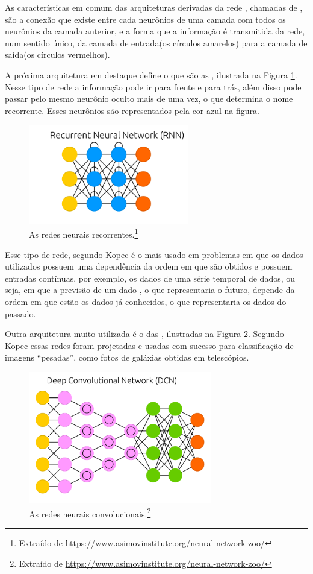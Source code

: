 As características em comum das arquiteturas derivadas da rede , chamadas de , são a conexão que existe entre cada neurônios de uma camada com todos os neurônios da camada anterior, e a forma que a informação é transmitida da rede, num sentido único, da camada de entrada(os círculos amarelos) para a camada de saída(os círculos vermelhos).

A próxima arquitetura em destaque define o que são as , ilustrada na Figura \ref{fig:estrutura_r}. Nesse tipo de rede a informação pode ir para frente e para trás, além disso pode passar pelo mesmo neurônio oculto mais de uma vez, o que determina o nome recorrente. Esses neurônios são representados pela cor azul na figura.

\begin{figure}[htb]
\centering
\includegraphics[width=7cm]{figuras/estrutura_r}
\caption{As redes neurais recorrentes.\footnote{Extraído de \url{https://www.asimovinstitute.org/neural-network-zoo/}}}
\label{fig:estrutura_r}
\end{figure}

Esse tipo de rede, segundo Kopec \citep{classic} é o mais usado em problemas em que os dados utilizados possuem uma dependência da ordem em que são obtidos e possuem entradas contínuas, por exemplo, os dados de uma série temporal de dados, ou seja, em que a previsão de um dado , o que representaria o futuro, depende da ordem em que estão os dados já conhecidos, o que representaria os dados do passado.

Outra arquitetura muito utilizada é o das , ilustradas na Figura \ref{fig:estrutura_c}.  Segundo Kopec \citep{classic} essas redes foram projetadas e usadas com sucesso para classificação de imagens ``pesadas'', como fotos de galáxias obtidas em telescópios.

\begin{figure}[htb]
\centering
\includegraphics[width=8cm]{figuras/estrutura_c}
\caption{As redes neurais convolucionais.\footnote{Extraído de \url{https://www.asimovinstitute.org/neural-network-zoo/}}}
\label{fig:estrutura_c}
\end{figure}


